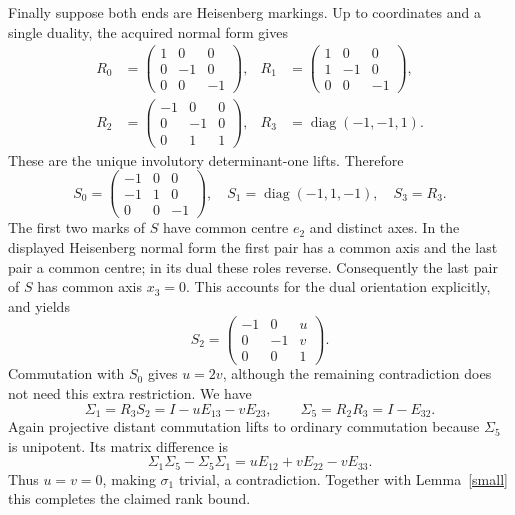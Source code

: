 \documentclass[11pt]{article}
\begin{document}
Finally suppose both ends are Heisenberg markings. Up to coordinates
and a single duality, the acquired normal form gives
\[\begin{aligned}
 R_0&=\begin{pmatrix}1&0&0\\0&-1&0\\0&0&-1\end{pmatrix},&
 R_1&=\begin{pmatrix}1&0&0\\1&-1&0\\0&0&-1\end{pmatrix},\\
 R_2&=\begin{pmatrix}-1&0&0\\0&-1&0\\0&1&1\end{pmatrix},&
 R_3&=\operatorname{diag}(-1,-1,1).
\end{aligned}\]
These are the unique involutory determinant-one lifts. Therefore
\[
 S_0=\begin{pmatrix}-1&0&0\\-1&1&0\\0&0&-1\end{pmatrix},\quad
 S_1=\operatorname{diag}(-1,1,-1),\quad S_3=R_3.
\]
The first two marks of $S$ have common centre $e_2$ and distinct axes.
In the displayed Heisenberg normal form the first pair has a common
axis and the last pair a common centre; in its dual these roles reverse.
Consequently the last pair of $S$ has common axis $x_3=0$.
This accounts for the dual orientation explicitly, and yields
\[
 S_2=\begin{pmatrix}-1&0&u\\0&-1&v\\0&0&1\end{pmatrix}.
\]
Commutation with $S_0$ gives $u=2v$, although the remaining contradiction
does not need this extra restriction. We have
\[
 \Sigma_1=R_3S_2=I-uE_{13}-vE_{23},\qquad
 \Sigma_5=R_2R_3=I-E_{32}.
\]
Again projective distant commutation lifts to ordinary commutation
because $\Sigma_5$ is unipotent. Its matrix difference is
\[
 \Sigma_1\Sigma_5-\Sigma_5\Sigma_1
       =uE_{12}+vE_{22}-vE_{33}.
\]
Thus $u=v=0$, making $\sigma_1$ trivial, a contradiction.
Together with Lemma~\ref{small} this completes the claimed rank bound.
\end{document}
